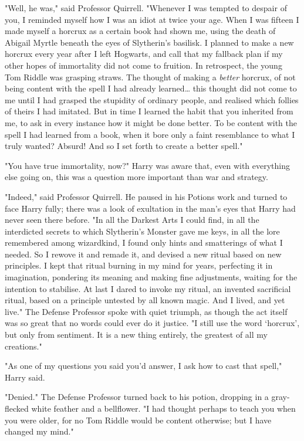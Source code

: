 "Well, he was," said Professor Quirrell. "Whenever I was tempted to despair of 
you, I reminded myself how I was an idiot at twice your age. When I was fifteen 
I made myself a horcrux as a certain book had shown me, using the death of 
Abigail Myrtle beneath the eyes of Slytherin's basilisk. I planned to make a 
new horcrux every year after I left Hogwarts, and call that my fallback plan if 
my other hopes of immortality did not come to fruition. In retrospect, the 
young Tom Riddle was grasping straws. The thought of making a \emph{better} 
horcrux, of not being content with the spell I had already learned{\ldots} this 
thought did not come to me until I had grasped the stupidity of ordinary 
people, and realised which follies of theirs I had imitated. But in time I 
learned the habit that you inherited from me, to ask in every instance how it 
might be done better. To be content with the spell I had learned from a book, 
when it bore only a faint resemblance to what I truly wanted? Absurd! And so I 
set forth to create a better spell."

"You have true immortality, now?" Harry was aware that, even with everything 
else going on, this was a question more important than war and strategy.

"Indeed," said Professor Quirrell. He paused in his Potions work and turned to 
face Harry fully; there was a look of exultation in the man's eyes that Harry 
had never seen there before. "In all the Darkest Arts I could find, in all the 
interdicted secrets to which Slytherin's Monster gave me keys, in all the lore 
remembered among wizardkind, I found only hints and smatterings of what I 
needed. So I rewove it and remade it, and devised a new ritual based on new 
principles. I kept that ritual burning in my mind for years, perfecting it in 
imagination, pondering its meaning and making fine adjustments, waiting for the 
intention to stabilise. At last I dared to invoke my ritual, an invented 
sacrificial ritual, based on a principle untested by all known magic. And I 
lived, and yet live." The Defense Professor spoke with quiet triumph, as though 
the act itself was so great that no words could ever do it justice. "I still 
use the word `horcrux', but only from sentiment. It is a new thing entirely, 
the greatest of all my creations."

"As one of my questions you said you'd answer, I ask how to cast that spell," 
Harry said.

"Denied." The Defense Professor turned back to his potion, dropping in a 
gray-flecked white feather and a bellflower. "I had thought perhaps to teach 
you when you were older, for no Tom Riddle would be content otherwise; but I 
have changed my mind."

